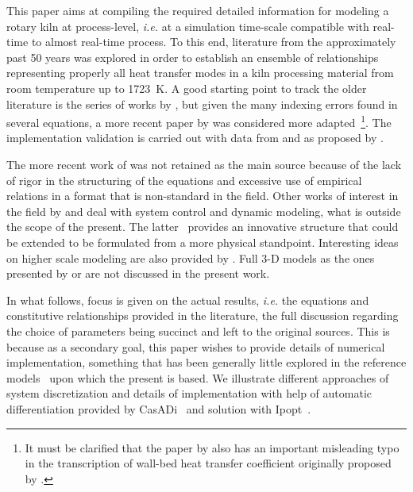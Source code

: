 \documentclass[11pt]{paper}
\begin{document}
This paper aims at compiling the required detailed information for modeling a rotary kiln at process-level, \emph{i.e.} at a simulation time-scale compatible with real-time to almost real-time process. To this end, literature from the approximately past 50 years was explored in order to establish an ensemble of relationships representing properly all heat transfer modes in a kiln processing material from room temperature up to \SI{1723}{\kelvin}. A good starting point to track the older literature is the series of works by \textcite{Mujumdar2006i}, but given the many indexing errors found in several equations, a more recent paper by \textcite{Hanein2017} was considered more adapted~\footnote{It must be clarified that the paper by \textcite{Hanein2017} also has an important misleading typo in the transcription of wall-bed heat transfer coefficient originally proposed by \textcite{Li2005}.}. The implementation validation is carried out with data from \textcite{Barr1986PhD} and \textcite{Tscheng1979} as proposed by \textcite{Hanein2017}. 

The more recent work of \textcite{Shcherbina2019} was not retained as the main source because of the lack of rigor in the structuring of the equations and excessive use of empirical relations in a format that is non-standard in the field. Other works of interest in the field by \textcite{Sun2020} and \textcite{NZi2013} deal with system control and dynamic modeling, what is outside the scope of the present. The latter~\cite{NZi2013} provides an innovative structure that could be extended to be formulated from a more physical standpoint. Interesting ideas on higher scale modeling are also provided by \textcite{Boateng1996}. Full 3-D models as the ones presented by \textcite{Gunnarsson2020} or \textcite{Witt2022} are not discussed in the present work.

In what follows, focus is given on the actual results, \emph{i.e.} the equations and constitutive relationships provided in the literature, the full discussion regarding the choice of parameters being succinct and left to the original sources. This is because as a secondary goal, this paper wishes to provide details of numerical implementation, something that has been generally little explored in the reference models~\cite{Boateng1996,Mujumdar2006i,Mujumdar2006ii,Fan2013,Csernyei2016,Hanein2017,Shcherbina2019} upon which the present is based. We illustrate different approaches of system discretization and details of implementation with help of automatic differentiation provided by {CasADi}~\cite{Andersson2018} and solution with {Ipopt}~\cite{Wachter2005}.
\end{document}
